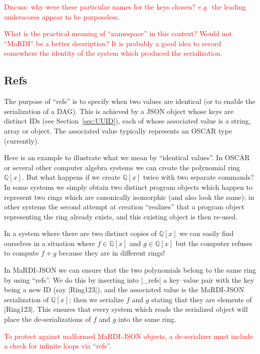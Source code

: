 \documentclass{article}
\newcommand{\blueverb}{\collectverb{\color{blue}\colorbox{gray!20}}}
\newcommand{\greenverb}{\collectverb{\color{green}\colorbox{gray!20}}}
\newcommand{\MaRDIJSON}{MaRDI-JSON}
\newcommand \eg {\textit{e.g.}}
\newcommand \QQ {{\mathbb Q}}
\def\red#1{\textcolor{red}{#1}}
\begin{document}
\red{Discuss: why were these particular names for the keys chosen?
  \eg~the leading underscores appear to be purposeless.}

\red{What is the practical meaning of ``namespace'' in this context?  Would not ``MaRDI'' be a better decsription?  It is probably a good idea to record somewhere the identity of the system which produced the serialization.}


\subsection{Refs}
\label{sec:refs}

The purpose of ``refs'' is to specify when two values are identical
(or to enable the serialization of a DAG).  This is achieved by a JSON
object whose keys are distinct IDs (see Section~\ref{sec:UUID}), each
of whose associated value is a string, array or object.  The
associated value typically represents an OSCAR type (currently).

Here is an example to illustrate what we mean by ``identical values''.
In OSCAR or several other computer algebra systems we can create the
polynomial ring $\QQ[x]$.  But what happens if we create $\QQ[x]$
twice with two separate commands?  In some systems we simply obtain
two distinct program objects which happen to represent two rings which
are canonically isomorphic (and also look the same); in other systems
the second attempt at creation ``realizes'' that a program object
representing the ring already exists, and this existing object is then
re-used.

In a system where there are two distinct copies of $\QQ[x]$ we can easily
find ourselves in a situation where $f \in \QQ[x]$ and $g \in \QQ[x]$
but the computer refuses to compute $f+g$ because they are in different rings!

In {\MaRDIJSON} we can ensure that the two polynomials belong to the same ring
by using ``refs''.  We do this by inserting into \blueverb|_refs| a key--value pair
with the key being a new ID (say \greenverb|Ring123|), and the associated value is the {\MaRDIJSON}
serialization of $\QQ[x]$; then we serialize $f$ and $g$ stating that they are
elements of \greenverb|Ring123|.  This ensures that every system which reads the
serialized object will place the de-serializations of $f$ and $g$ into the same
ring.

\red{To protect against malformed {\MaRDIJSON} objects, a de-serializer
  must include a check for infinite loops via ``refs''.}
\end{document}
